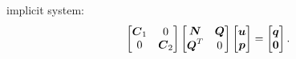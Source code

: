 implicit system:
\begin{equation}
    \begin{bmatrix}
        \boldsymbol{C}_1 & 0 \\
        0 & \boldsymbol{C}_2 
    \end{bmatrix}
    \begin{bmatrix}
        \boldsymbol{N} & \boldsymbol{Q} \\
        \boldsymbol{Q}^T & 0
    \end{bmatrix}
    \begin{bmatrix}
        \boldsymbol{u}  \\
        \boldsymbol{p}
    \end{bmatrix}
    = 
    \begin{bmatrix}
        \boldsymbol{q} \\
        \boldsymbol{0}
    \end{bmatrix}.
\end{equation}
